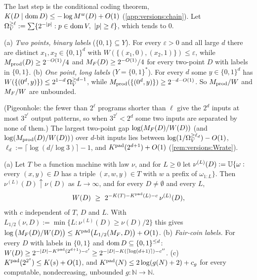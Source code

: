 The last step is the conditional coding theorem, $K(D\mid\operatorname{dom} D)\le-\log M^{w}(D)+O(1)$ (\cref{app:versions:chain}). Let $\Omtail{\ell}:=\sum\{2^{-|p|}:p\in\dom V,\ |p|\ge\ell\}$, which tends to $0$.

\begin{proposition}\label{prop:versions:Wgap}
(a) \emph{Two points, binary labels} ($\{0,1\}\subseteq Y$). For every $\varepsilon>0$ and all large $d$ there are distinct $x_1,x_2\in\{0,1\}^d$ with $W(\{(x_1,0),(x_2,1)\})\le\varepsilon$, while $M_{\mathrm{prod}}(D)\ge2^{-O(1)}/4$ and $M_{F}(D)\ge2^{-O(1)}/4$ for every two-point $D$ with labels in $\{0,1\}$.
(b) \emph{One point, long labels} ($Y=\{0,1\}^*$). For every $d$ some $y\in\{0,1\}^d$ has $W(\{(0^d,y)\})\le2^{1-d}\,\Omega_{V}^{\ge d-1}$, while $M_{\mathrm{prod}}(\{(0^d,y)\})\ge2^{-d-O(1)}$.
So $M_{\mathrm{prod}}/W$ and $M_{F}/W$ are unbounded.
\end{proposition}

(Pigeonhole: the fewer than $2^\ell$ programs shorter than $\ell$ give the $2^d$ inputs at most $3^{2^\ell}$ output patterns, so when $3^{2^\ell}<2^d$ some two inputs are separated by none of them.) The largest two-point gap $\log(M_{F}(D)/W(D))$ (and $\log(M_{\mathrm{prod}}(D)/W(D))$) over $d$-bit inputs lies between $\log(1/\Omega_{V}^{\ge \ell_d})-O(1)$, $\ell_d:=\lceil\log(d/\log3)\rceil-1$, and $K^{\mathrm{pad}}(2^{d+1})+O(1)$ (\cref{rem:versions:Wrate}).

\begin{proposition}\label{prop:versions:tape}
(a) Let $T$ be a function machine with law $\nu$, and for $L\ge0$ let $\nu^{(L)}(D):=\mathbb{U}\{\omega:$ every $(x,y)\in D$ has a triple $(x,w,y)\in T$ with $w$ a prefix of $\omega_{1:L}\}$. Then $\nu^{(L)}(D)\uparrow\nu(D)$ as $L\to\infty$, and for every $D\ne\emptyset$ and every $L$,
\[
W(D)\ \ge\ 2^{-K(T)-\Kpad(L)-c}\,\nu^{(L)}(D),
\]
with $c$ independent of $T$, $D$ and $L$. With $L_{1/2}(\nu,D):=\min\{L:\nu^{(L)}(D)\ge\nu(D)/2\}$ this gives $\log\big(M_{F}(D)/W(D)\big)\le K^{\mathrm{pad}}\big(L_{1/2}(M_{F},D)\big)+O(1)$.
(b) \emph{Fair-coin labels.} For every $D$ with labels in $\{0,1\}$ and $\operatorname{dom} D\subseteq\{0,1\}^{\le d}$: $W(D)\ge2^{-|D|-K^{\mathrm{pad}}(2^{d+1})-c'}\ge2^{-|D|-K(\lceil\log(d+1)\rceil)-c''}$.
(c) $K^{\mathrm{pad}}(2^{2^s})\le K(s)+O(1)$, and $K^{\mathrm{pad}}(N)\le2\log(g(N)+2)+c_g$ for every computable, nondecreasing, unbounded $g:\mathbb N\to\mathbb N$.
\end{proposition}

